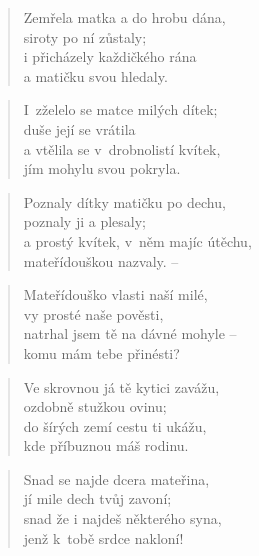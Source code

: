 \begin{verse}
Zemřela matka a do hrobu dána, \\
siroty po ní zůstaly; \\
i přicházely každičkého rána \\
a matičku svou hledaly.
\end{verse}

\begin{verse}
I~zželelo se matce milých dítek; \\
duše její se vrátila \\
a vtělila se v~drobnolistí kvítek, \\
jím mohylu svou pokryla.
\end{verse}

\begin{verse}
Poznaly dítky matičku po dechu, \\
poznaly ji a plesaly; \\
a prostý kvítek, v~něm majíc útěchu, \\
mateřídouškou nazvaly. --
\end{verse}

\begin{verse}
Mateřídouško vlasti naší milé, \\
vy prosté naše pověsti, \\
natrhal jsem tě na dávné mohyle -- \\
komu mám tebe přinésti?
\end{verse}

\begin{verse}
Ve skrovnou já tě kytici zavážu, \\
ozdobně stužkou ovinu; \\
do šírých zemí cestu ti ukážu, \\
kde příbuznou máš rodinu.
\end{verse}

\begin{verse}
Snad se najde dcera mateřina, \\
jí mile dech tvůj zavoní; \\
snad že i najdeš některého syna, \\
jenž k~tobě srdce nakloní!
\end{verse}